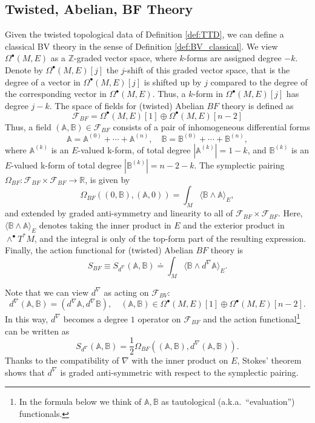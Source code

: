 \documentclass[reqno]{amsart}
\theoremstyle{definition}
\theoremstyle{remark}
\newcommand{\A}{\mathbb{A}}
\newcommand{\B}{\mathbb{B}}
\renewcommand{\d}{d^\nabla}
\newcommand{\R}{\mathbb{R}}
\newcommand{\Z}{\mathbb{Z}}
\newcommand{\F}{\mathcal{F}}
\begin{document}
\subsection{Twisted, Abelian, BF Theory}
\label{BF_theory}
Given the twisted topological data of Definition \ref{def:TTD}, we can define a classical BV theory in the sense of Definition \ref{def:BV_classical}. We view $\Omega^\bullet(M,E)$ as a $\Z$-graded vector space, where $k$-forms are assigned degree $-k$. Denote by $\Omega^\bullet(M,E)[j]$ the $j$-shift of this graded vector space, that is the degree of a vector in $\Omega^\bullet(M,E)[j]$ is shifted up by $j$ compared to the degree of the corresponding vector in $\Omega^\bullet(M,E)$. Thus, a $k$-form in $\Omega^\bullet(M,E)[j]$ has degree $j-k$. The space of fields for (twisted) Abelian $BF$ theory is defined as
\begin{equation}
    \F_{BF} = \Omega^\bullet(M,E)[1] \oplus \Omega^\bullet(M,E)[n-2]
\end{equation}
Thus, a field $(\A,\B) \in \F_{BF}$ consists of a pair of inhomogeneous differential forms
$$\A = \A^{(0)} + \cdots + \A^{(n)}, \quad \B = \B^{(0)} + \cdots + \B^{(n)},$$
where $\A^{(k)}$ is an $E$-valued k-form, of total degree $|\A^{(k)}| = 1-k$, and $\B^{(k)}$ is an $E$-valued k-form of total degree $|\B^{(k)}| = n-2-k$. The symplectic pairing $\Omega_{BF}: \F_{BF}\times\F_{BF} \to \R$, is given by
\begin{equation}
    \Omega_{BF}((0,\B),(\A,0)) = \int_M \langle\B\wedge\A\rangle_E,
\end{equation}
and extended by graded anti-symmetry and linearity to all of $\F_{BF}\times\F_{BF}$. Here, $\langle\B\wedge\A\rangle_E$ denotes taking the inner product in $E$ and the exterior product in $\wedge^\bullet T^*M$, and the integral is only of the top-form part of the resulting expression. Finally, the action functional for (twisted) Abelian $BF$ theory is
\begin{equation}
\label{BF_action_traditional}
    S_{BF}\equiv S_{\d}(\A,\B) \doteq \int_M \langle\B\wedge\d\A\rangle_E.
\end{equation}

\begin{rmk}
Note that we can view $\d$ as acting on $\F_{BV}$:
$$\d (\A,\B) = (\d\A,\d\B), \quad (\A,\B) \in \Omega^\bullet(M,E)[1] \oplus \Omega^\bullet(M,E)[n-2].$$
In this way, $\d$ becomes a degree $1$ operator on $\F_{BF}$ and the action functional\footnote{In the formula below we think of $\A,\B$ as tautological (a.k.a.\ ``evaluation'') functionals.} can be written as 
$$S_{\d}(\A,\B) = \frac{1}{2}\Omega_{BF}((\A,\B), \d(\A,\B)).$$
Thanks to the compatibility of $\nabla$ with the inner product on $E$, Stokes' theorem shows that $\d$ is graded anti-symmetric with respect to the symplectic pairing.
\end{rmk}
\end{document}
